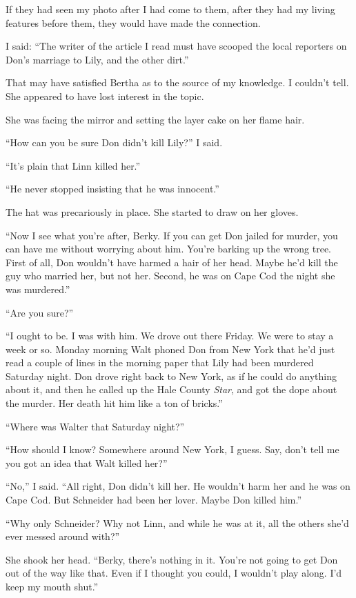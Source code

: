 \documentclass{novel}
\begin{document}
If they had seen my photo after I had come to them, after they had my living features before them, they would have made the connection.

I said: “The writer of the article I read must have scooped the local reporters on Don’s marriage to Lily, and the other dirt.”

That may have satisfied Bertha as to the source of my knowledge. I couldn’t tell. She appeared to have lost \mbox{interest} in the topic.

She was facing the mirror and setting the layer cake on her flame hair.

“How can you be sure Don didn’t kill Lily?” I said.

“It’s plain that Linn killed her.”

“He never stopped insisting that he was innocent.”

The hat was precariously in place. She started to draw on her gloves. 

“Now I see what you’re after, Berky. If you can get Don jailed for murder, you can have me without worrying about him. You’re barking up the wrong tree. First of all, Don wouldn’t have harmed a hair of her head. Maybe he’d kill the guy who married her, but not her. Second, he was on Cape Cod the night she was murdered.”

“Are you sure?”

“I ought to be. I was with him. We drove out there Friday. We were to stay a week or so. Monday morning Walt phoned Don from New York that he’d just read a couple of lines in the morning paper that Lily had been murdered Saturday night. Don drove right back to New York, as if he could do anything about it, and then he called up the Hale County \textit{Star}, and got the dope about the murder. Her death hit him like a ton of bricks.”

“Where was Walter that Saturday night?”

“How should I know? Somewhere around New York, I guess. Say, don’t tell me you got an idea that Walt killed her?”

“No,” I said. “All right, Don didn’t kill her. He wouldn’t harm her and he was on Cape Cod. But Schneider had been her lover. Maybe Don killed him.”

“Why only Schneider? Why not Linn, and while he was at it, all the others she’d ever messed around with?” 

She shook her head. “Berky, there’s nothing in it. You’re not going to get Don out of the way like that. Even if I thought you could, I wouldn’t play along. I’d keep my mouth shut.” 
\end{document}
